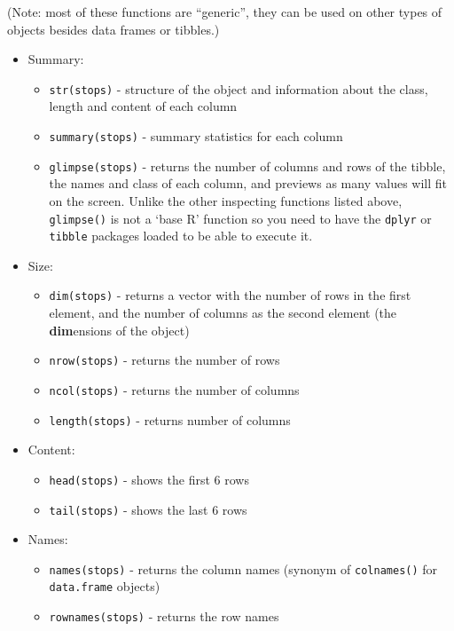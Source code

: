\documentclass[
]{book}
\providecommand{\tightlist}{%
  \setlength{\itemsep}{0pt}\setlength{\parskip}{0pt}}
\begin{document}
(Note: most of these functions are ``generic'', they can be used on other types of
objects besides data frames or tibbles.)

\begin{itemize}
\tightlist
\item
  Summary:

  \begin{itemize}
  \tightlist
  \item
    \texttt{str(stops)} - structure of the object and information about the class, length and
    content of each column
  \item
    \texttt{summary(stops)} - summary statistics for each column
  \item
    \texttt{glimpse(stops)} - returns the number of columns and rows of the tibble, the names and class of each column, and previews as many values will fit on the screen. Unlike the other inspecting functions listed above, \texttt{glimpse()} is not a `base R' function so you need to have the \texttt{dplyr} or \texttt{tibble} packages loaded to be able to execute it.
  \end{itemize}
\item
  Size:

  \begin{itemize}
  \tightlist
  \item
    \texttt{dim(stops)} - returns a vector with the number of rows in the first element,
    and the number of columns as the second element (the \textbf{dim}ensions of
    the object)
  \item
    \texttt{nrow(stops)} - returns the number of rows
  \item
    \texttt{ncol(stops)} - returns the number of columns
  \item
    \texttt{length(stops)} - returns number of columns
  \end{itemize}
\item
  Content:

  \begin{itemize}
  \tightlist
  \item
    \texttt{head(stops)} - shows the first 6 rows
  \item
    \texttt{tail(stops)} - shows the last 6 rows
  \end{itemize}
\item
  Names:

  \begin{itemize}
  \tightlist
  \item
    \texttt{names(stops)} - returns the column names (synonym of \texttt{colnames()} for \texttt{data.frame}
    objects)
  \item
    \texttt{rownames(stops)} - returns the row names
  \end{itemize}
\end{itemize}
\end{document}
